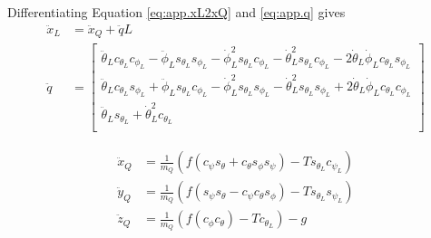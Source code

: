Differentiating Equation \ref{eq:app.xL2xQ} and \ref{eq:app.q} gives
\begin{equation}\label{key}
\begin{aligned}
\ddot{x}_L&=\ddot{x}_Q+\ddot{q}L\\
\ddot{q}&=\begin{bmatrix}
\ddot{\theta}_Lc_{\theta_L}c_{\phi_L}-\ddot{\phi}_Ls_{\theta_L}s_{\phi_L}-\dot{\phi}_L^2s_{\theta_L}c_{\phi_L}-\dot{\theta}_L^2s_{\theta_L}c_{\phi_L}-2\dot{\theta}_L\dot{\phi}_Lc_{\theta_L}s_{\phi_L}\\
\ddot{\theta}_Lc_{\theta_L}s_{\phi_L}+\ddot{\phi}_Ls_{\theta_L}c_{\phi_L}-\dot{\phi}_L^2s_{\theta_L}s_{\phi_L}-\dot{\theta}_L^2s_{\theta_L}s_{\phi_L}+2\dot{\theta}_L\dot{\phi}_Lc_{\theta_L}c_{\phi_L}\\
\ddot{\theta}_Ls_{\theta_L}+\dot{\theta}_L^2 c_{\theta_L}\\
\end{bmatrix}
\end{aligned}
\end{equation}

\begin{equation}\label{key}
\begin{aligned}
\ddot{x}_Q&=\frac{1}{m_Q}(f(c_{\psi}s_{\theta}+c_{\theta}s_{\phi}s_{\psi})-Ts_{\theta_L}c_{\psi_L})\\
\ddot{y}_Q&=\frac{1}{m_Q}(f(s_{\psi}s_{\theta}-c_{\psi}c_{\theta}s_{\phi})-Ts_{\theta_L}s_{\psi_L})\\
\ddot{z}_Q&=\frac{1}{m_Q}(f(c_{\phi}c_{\theta})-Tc_{\theta_L})-g\\
\end{aligned}
\end{equation}

